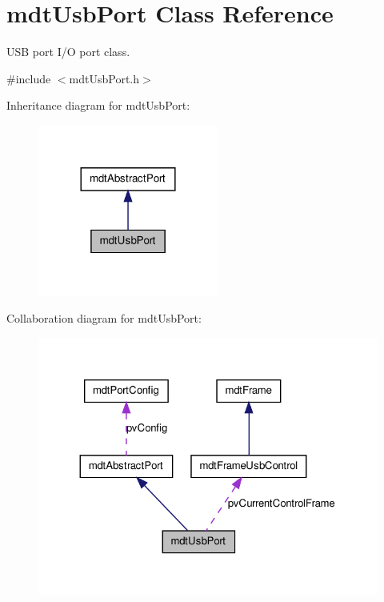 \hypertarget{classmdt_usb_port}{
\section{mdtUsbPort Class Reference}
\label{classmdt_usb_port}
}


USB port I/O port class.  




{\ttfamily \#include $<$mdtUsbPort.h$>$}



Inheritance diagram for mdtUsbPort:\nopagebreak
\begin{figure}[H]
\begin{center}
\leavevmode
\includegraphics[width=168pt]{classmdt_usb_port__inherit__graph}
\end{center}
\end{figure}


Collaboration diagram for mdtUsbPort:\nopagebreak
\begin{figure}[H]
\begin{center}
\leavevmode
\includegraphics[width=324pt]{classmdt_usb_port__coll__graph}
\end{center}
\end{figure}
